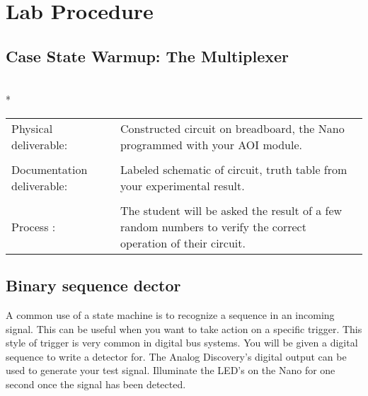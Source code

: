       \clearpage
      
\section{ Lab Procedure}
  \subsection{Case State Warmup: The Multiplexer}

    \vspace{15px}
    \begin{centering}
      \begin{fminipage}{.43\textwidth}
        \vspace{3px}
        \\*
        \vspace{10px}
        \begin{tabular}{p{1.8cm}  p{5.4cm}}
          \raggedright Physical deliverable:                         &Constructed circuit on breadboard,  the Nano programmed with your AOI module.\\
          \\
          \raggedright Documentation deliverable:          & Labeled schematic of circuit,  truth table from your  experimental result.\\
          \\
          Process :                                                                            &The student will be asked the result of a few random numbers to verify the correct operation of their circuit.
        \end{tabular}
      \end{fminipage}
    \end{centering} 

  \subsection{Binary sequence dector}
    A common use of a state machine is to recognize a sequence in an incoming signal. This can be useful when you want to take action on a specific trigger. This style of trigger is very common in digital bus systems. You will be given a digital sequence to write a detector for. The Analog Discovery's  digital output can be used to generate your test signal. Illuminate the LED's on the  Nano for one second once the signal has been detected.

